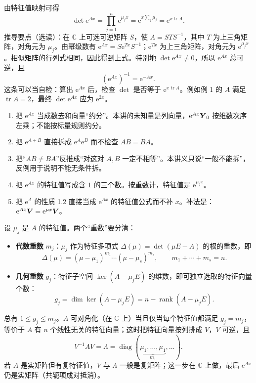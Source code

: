 \documentclass[11pt]{ctexart}
\let\basesubhdr\subhdr
\renewcommand{\subhdr}[1]{\needspace{8\baselineskip}\basesubhdr{#1}}
\let\basehdr\hdr
\renewcommand{\hdr}[2]{\needspace{11\baselineskip}\basehdr{#1}{#2}}
\newcommand{\C}{\mathbb{C}}
\DeclareMathOperator{\rank}{rank}
\DeclareMathOperator{\diag}{diag}
\DeclareMathOperator{\tr}{tr}
\newcommand{\ee}{\mathrm{e}}
\begin{document}

由特征值映射可得
\[
\det\ee^{Ax}=\prod_{j=1}^{n}\ee^{\mu_jx}=\ee^{x\sum_j\mu_j}=\ee^{x\tr A}.
\]
推导要点（选读）：在 $\C$ 上可选可逆矩阵 $S$，使 $A=STS^{-1}$，其中 $T$ 为上三角矩阵，对角元为 $\mu_j$。由幂级数有 $\ee^{Ax}=S\ee^{Tx}S^{-1}$；$\ee^{Tx}$ 为上三角矩阵，对角元为 $\ee^{\mu_jx}$。相似矩阵的行列式相同，因此得到上式。特别地 $\det\ee^{Ax}\neq0$，所以 $\ee^{Ax}$ 总可逆，且
\[
(\ee^{Ax})^{-1}=\ee^{-Ax}.
\]
这条可以当自检：算出 $\ee^{Ax}$ 后，检查 $\det$ 是否等于 $\ee^{x\tr A}$。例如例 1 的 $A$ 满足 $\tr A=2$，最终 $\det\ee^{Ax}$ 应为 $\ee^{2x}$。


\begin{enumerate}
  \item 把 $\ee^{Ax}$ 当成数去和向量“约分”。本讲的未知量是列向量，$\ee^{Ax}\vect{Y}_0$ 按维数次序左乘；不能按标量规则约分。
  \item 把 $\ee^{A+B}$ 直接拆成 $\ee^{A}\ee^{B}$ 而不检查 $AB=BA$。
  \item 把“$AB\ne BA$”反推成“对这对 $A,B$ 一定不相等”。本讲义只说“一般不能拆”，反例用于说明不能无条件拆。
  \item 把 $\ee^{Ax}$ 的特征值写成含 $1$ 的三个数。按重数计，特征值是 $\ee^{\mu_jx}$。
  \item 把 $\ee^{A}$ 的性质 1.2 直接当成 $\ee^{Ax}$ 的特征值公式而不补 $x$。补法是：$\ee^{Ax}\vect{V}=\ee^{\mu x}\vect{V}$。
\end{enumerate}



设 $\mu_j$ 是 $A$ 的特征值。两个“重数”要分清：

\begin{itemize}
  \item \textbf{代数重数} $m_j$：$\mu_j$ 作为特征多项式 $\Delta(\mu)=\det(\mu E-A)$ 的根的重数，即
  \[
  \Delta(\mu)=(\mu-\mu_1)^{m_1}\cdots(\mu-\mu_s)^{m_s},\qquad m_1+\cdots+m_s=n .
  \]
  \item \textbf{几何重数} $g_j$：特征子空间 $\ker(A-\mu_jE)$ 的维数，即可独立选取的特征向量个数：
  \[
  g_j=\dim\ker(A-\mu_jE)=n-\rank(A-\mu_jE).
  \]
\end{itemize}

总有 $1\le g_j\le m_j$。$A$ 可对角化（在 $\C$ 上）当且仅当每个特征值都满足 $g_j=m_j$，等价于 $A$ 有 $n$ 个线性无关的特征向量；这时把特征向量按列排成 $V$，$V$ 可逆，且
\[
V^{-1}AV=\Lambda=\diag(\underbrace{\mu_1,\dots,\mu_1}_{m_1},\dots).
\]
若 $A$ 是实矩阵但有复特征值，$V$ 与 $\Lambda$ 一般是复矩阵；这一步在 $\C$ 上做，最后 $\ee^{Ax}$ 仍是实矩阵（共轭项成对抵消）。
\end{document}
